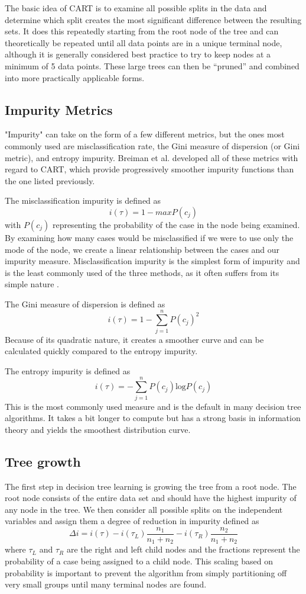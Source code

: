 \documentclass[12pt,english,letterpaper]{article}
\begin{document}
The basic idea of CART is to examine all possible splits in the data and determine which split creates the most significant difference between the resulting sets. It does this repeatedly starting from the root node of the tree and can theoretically be repeated until all data points are in a unique terminal node, although it is generally considered best practice to try to keep nodes at a minimum of 5 data points. These large trees can then be “pruned” and combined into more practically applicable forms.

\subsection*{Impurity Metrics}
"Impurity" can take on the form of a few different metrics, but the ones most commonly used are misclassification rate, the Gini measure of dispersion (or Gini metric), and entropy impurity. Breiman et al. developed all of these metrics with regard to CART, which provide progressively smoother impurity functions than the one listed previously.

The misclassification impurity is defined as
\[
i(\tau)=1-maxP(c_j)
\]
with $P(c_j)$ representing the probability of the case in the node being examined. By examining how many cases would be misclassified if we were to use only the mode of the node, we create a linear relationship between the cases and our impurity measure. Misclassification impurity is the simplest form of impurity and is the least commonly used of the three methods, as it often suffers from its simple nature \cite{ma}.

The Gini measure of dispersion is defined as 
\[
i(\tau)=1-\sum_{j=1}^n P (c_j)^2
\]
Because of its quadratic nature, it creates a smoother curve and can be calculated quickly compared to the entropy impurity.

The entropy impurity is defined as
\[i(\tau)=-\sum_{j=1}^n P(c_j)\text{log}P(c_j)\]
This is the most commonly used measure and is the default in many decision tree algorithms. It takes a bit longer to compute but has a strong basis in information theory \cite{duda} and yields the smoothest distribution curve.

\subsection*{Tree growth}
The first step in decision tree learning is growing the tree from a root node. The root node consists of the entire data set and should have the highest impurity of any node in the tree. We then consider all possible splits on the independent variables and assign them a degree of reduction in impurity defined as
\[
\Delta i=i(\tau)-i(\tau_L) \frac{n_1}{n_1+n_2}-i(\tau_R) \frac{n_2}{n_1+n_2}
\]
where $\tau_L$ and $\tau_R$ are the right and left child nodes and the fractions represent the probability of a case being assigned to a child node. This scaling based on probability is important to prevent the algorithm from simply partitioning off very small groups until many terminal nodes are found.
\end{document}
